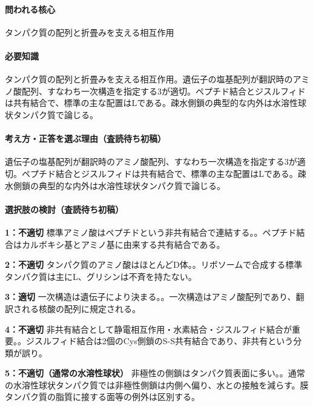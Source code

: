 \paragraph{問われる核心} タンパク質の配列と折畳みを支える相互作用

\paragraph{必要知識} タンパク質の配列と折畳みを支える相互作用。遺伝子の塩基配列が翻訳時のアミノ酸配列、すなわち一次構造を指定する3が適切。ペプチド結合とジスルフィドは共有結合で、標準の主な配置はLである。疎水側鎖の典型的な内外は水溶性球状タンパク質で論じる。

\paragraph{考え方・正答を選ぶ理由（査読待ち初稿）} 遺伝子の塩基配列が翻訳時のアミノ酸配列、すなわち一次構造を指定する3が適切。ペプチド結合とジスルフィドは共有結合で、標準の主な配置はLである。疎水側鎖の典型的な内外は水溶性球状タンパク質で論じる。

\paragraph{選択肢の検討（査読待ち初稿）}\mbox{}\par

\noindent\textbf{1：不適切} 標準アミノ酸はペプチドという非共有結合で連結する。。ペプチド結合はカルボキシ基とアミノ基に由来する共有結合である。\par

\noindent\textbf{2：不適切} タンパク質のアミノ酸はほとんどD体。。リボソームで合成する標準タンパク質は主にL、グリシンは不斉を持たない。\par

\noindent\textbf{3：適切} 一次構造は遺伝子により決まる。。一次構造はアミノ酸配列であり、翻訳される核酸の配列に規定される。\par

\noindent\textbf{4：不適切} 非共有結合として静電相互作用・水素結合・ジスルフィド結合が重要。。ジスルフィド結合は2個のCys側鎖のS-S共有結合であり、非共有という分類が誤り。\par

\noindent\textbf{5：不適切（通常の水溶性球状）} 非極性の側鎖はタンパク質表面に多い。。通常の水溶性球状タンパク質では非極性側鎖は内側へ偏り、水との接触を減らす。膜タンパク質の脂質に接する面等の例外は区別する。\par

